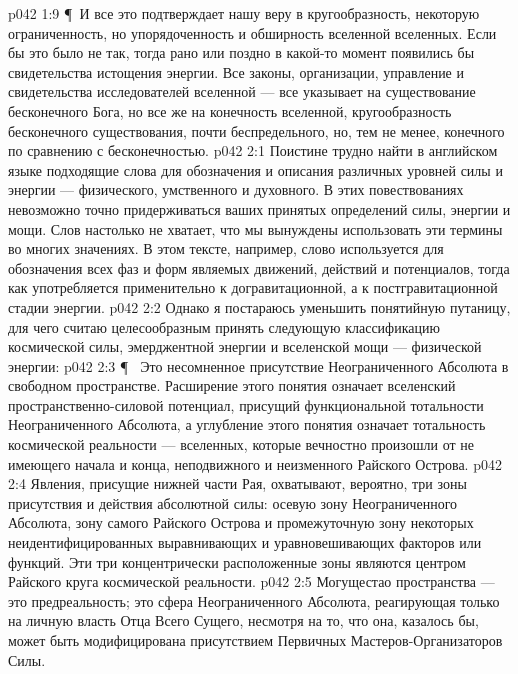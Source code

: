 \vs p042 1:9 \P\ И все это подтверждает нашу веру в кругообразность, некоторую ограниченность, но упорядоченность и обширность вселенной вселенных. Если бы это было не так, тогда рано или поздно в какой\hyp{}то момент появились бы свидетельства истощения энергии. Все законы, организации, управление и свидетельства исследователей вселенной --- все указывает на существование бесконечного Бога, но все же на конечность вселенной, кругообразность бесконечного существования, почти беспредельного, но, тем не менее, конечного по сравнению с бесконечностью.
\vs p042 2:1 Поистине трудно найти в английском языке подходящие слова для обозначения и описания различных уровней силы и энергии --- физического, умственного и духовного. В этих повествованиях невозможно точно придерживаться ваших принятых определений силы, энергии и мощи. Слов настолько не хватает, что мы вынуждены использовать эти термины во многих значениях. В этом тексте, например, слово  используется для обозначения всех фаз и форм являемых движений, действий и потенциалов, тогда как  употребляется применительно к догравитационной, а  к постгравитационной стадии энергии.
\vs p042 2:2 Однако я постараюсь уменьшить понятийную путаницу, для чего считаю целесообразным принять следующую классификацию космической силы, эмерджентной энергии и вселенской мощи --- физической энергии:
\vs p042 2:3 \P\ \bibnobreakspace {}  Это несомненное присутствие Неограниченного Абсолюта в свободном пространстве. Расширение этого понятия означает вселенский пространственно\hyp{}силовой потенциал, присущий функциональной тотальности Неограниченного Абсолюта, а углубление этого понятия означает тотальность космической реальности --- вселенных, которые вечностно произошли от не имеющего начала и конца, неподвижного и неизменного Райского Острова.
\vs p042 2:4 Явления, присущие нижней части Рая, охватывают, вероятно, три зоны присутствия и действия абсолютной силы: осевую зону Неограниченного Абсолюта, зону самого Райского Острова и промежуточную зону некоторых неидентифицированных выравнивающих и уравновешивающих факторов или функций. Эти три концентрически расположенные зоны являются центром Райского круга космической реальности.
\vs p042 2:5 Могущестао пространства --- это предреальность; это сфера Неограниченного Абсолюта, реагирующая только на личную власть Отца Всего Сущего, несмотря на то, что она, казалось бы, может быть модифицирована присутствием Первичных Мастеров\hyp{}Организаторов Силы.
